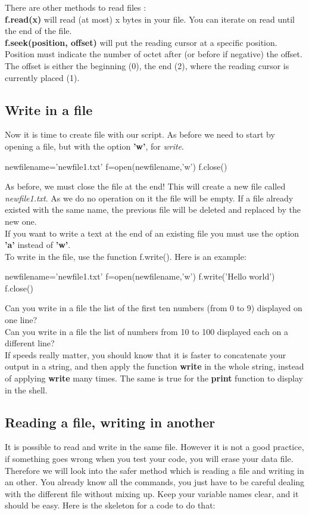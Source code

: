 \documentclass[article,10pt]{scrartcl}
\begin{document}
There are other methods to read files :\\
\textbf{f.read(x)} will read (at most) x bytes in your file. You can iterate on read until the end of the file.\\
\textbf{f.seek(position, offset)} will put the reading cursor at a specific position. Position must indicate the number of octet after (or before if negative) the offset. The offset is either the beginning (0), the end (2), where the reading cursor is currently placed (1).

\subsection*{Write in a file}
Now it is time to create file with our script. As before we need to start by opening a file, but with the option \textbf{'w'}, for \textit{write}. 
\begin{python}
newfilename='newfile1.txt'
f=open(newfilename,'w')
f.close()
\end{python}
As before, we must close the file at the end! This will create a new file called \textit{newfile1.txt}. As we do no operation on it the file will be empty. If a file already existed with the same name, the previous file will be deleted and replaced by the new one. \\
If you want to write a text at the end of an existing file you must use the option \textbf{'a'} instead of \textbf{'w'}. \\
To write in the file, use the function f.write(). Here is an example:
\begin{python}
newfilename='newfile1.txt'
f=open(newfilename,'w')
f.write('Hello world')
f.close()
\end{python}

Can you write in a file the list of the first ten numbers (from 0 to 9) displayed on one line?
\\
Can you write in a file the list of numbers from 10 to 100 displayed each on a different line?
\\

If speeds really matter, you should know that it is faster to concatenate your output in a string, and then apply the function \textbf{write} in the whole string, instead of applying \textbf{write} many times. The same is true for the \textbf{print} function to display in the shell.

\subsection*{Reading a file, writing in another}
It is possible to read and write in the same file. However it is not a good practice, if something goes wrong when you test your code, you will erase your data file. Therefore we will look into the safer method which is reading a file and writing in an other. You already know all the commands, you just have to be careful dealing with the different file without mixing up. Keep your variable names clear, and it should be easy. Here is the skeleton for a code to do that:
\end{document}
